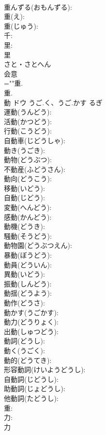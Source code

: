 \documentclass[8pt]{extreport}
\begin{document}
\begin{CJK}{UTF8}{min}
\\	重んずる(おもんずる): 
\\	重(え): 
\\	重(じゅう): 
\\	千: 
\\	里: 
\\	里	
\\	さと・さとへん	
\\	会意 
\\	=""重.
\\	重.
\\	動	ドウ	うご.く、うご.かす	るぎ	
\\	運動(うんどう): 
\\	活動(かつどう): 
\\	行動(こうどう): 
\\	自動車(じどうしゃ): 
\\	動き(うごき): 
\\	動物(どうぶつ): 
\\	不動産(ふどうさん): 
\\	動向(どうこう): 
\\	移動(いどう): 
\\	自動(じどう): 
\\	変動(へんどう): 
\\	感動(かんどう): 
\\	動機(どうき): 
\\	騒動(そうどう): 
\\	動物園(どうぶつえん): 
\\	暴動(ぼうどう): 
\\	動員(どういん): 
\\	異動(いどう): 
\\	振動(しんどう): 
\\	動揺(どうよう): 
\\	動作(どうさ): 
\\	動かす(うごかす): 
\\	動力(どうりょく): 
\\	出動(しゅつどう): 
\\	動詞(どうし): 
\\	動く(うごく): 
\\	動的(どうてき): 
\\	形容動詞(けいようどうし): 
\\	自動詞(じどうし): 
\\	助動詞(じょどうし): 
\\	他動詞(たどうし): 
\\	重: 
\\	力: 
\\	力	

\end{CJK}
\end{document}
